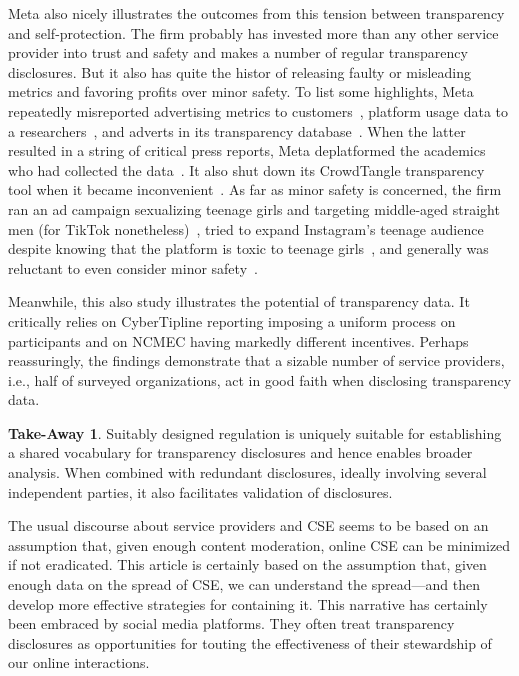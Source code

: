 \documentclass[anonymous,nonacm,screen,12pt]{acmart}
\newcommand\V[1]{{#1}}
\newcommand\V[1]{\textsc{\MakeLowercase{#1}}}
\theoremstyle{definition}
\newtheorem{takeout}{Take-Away}
\begin{document}
Meta also nicely illustrates the outcomes from this tension between transparency
and self-protection. The firm probably has invested more than any other service
provider into trust and safety and makes a number of regular transparency
disclosures. But it also has quite the histor of releasing faulty or misleading
metrics and favoring profits over minor safety. To list some highlights, Meta
repeatedly misreported advertising metrics to customers~\cite{BruellPatel2020,
VranicaMarshall2016}, platform usage data to a researchers~\cite{Timberg2021},
and adverts in its transparency database~\cite{Rosenberg2019}. When the latter
resulted in a string of critical press reports, Meta deplatformed the academics
who had collected the data~\cite{EdelsonMcCoy2021a}. It also shut down its
CrowdTangle transparency tool when it became inconvenient~\cite{Kerr2024}. As
far as minor safety is concerned, the firm ran an ad campaign sexualizing
teenage girls and targeting middle-aged straight men (for TikTok
nonetheless)~\cite{SilvermanMac2020}, tried to expand Instagram's teenage
audience despite knowing that the platform is toxic to teenage
girls~\cite{WellsHorwitzea2021}, and generally was reluctant to even consider
minor safety~\cite{SungSilberling2024}.

Meanwhile, this also study illustrates the potential of transparency data. It
critically relies on CyberTipline reporting imposing a uniform process on
participants and on \V{NCMEC} having markedly different incentives. Perhaps
reassuringly, the findings demonstrate that a sizable number of service
providers, i.e., half of surveyed organizations, act in good faith when
disclosing transparency data.

\begin{takeout}
Suitably designed regulation is uniquely suitable for establishing a shared
vocabulary for transparency disclosures and hence enables broader analysis. When
combined with redundant disclosures, ideally involving several independent
parties, it also facilitates validation of disclosures.
\end{takeout}

\noindent{}The usual discourse about service providers and \V{CSE} seems to be
based on an assumption that, given enough content moderation, online \V{CSE} can
be minimized if not eradicated. This article is certainly based on the
assumption that, given enough data on the spread of \V{CSE}, we can understand
the spread---and then develop more effective strategies for containing it. This
narrative has certainly been embraced by social media platforms. They often
treat transparency disclosures as opportunities for touting the effectiveness of
their stewardship of our online interactions.
\end{document}
